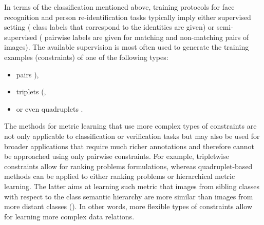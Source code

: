 In terms of the classification mentioned above, training protocols for face recognition and person re-identification tasks typically imply either supervised setting (\ie{} class labels that correspond to the identities are given) or semi-supervised (\ie{} pairwise labels are given for matching and non-matching pairs of images). The available supervision is most often used to generate the training examples (constraints) of one of the following types: 
\begin{itemize}
    \item pairs \citep{davis2007information,mignon2012pcca,hirzer2012person,koestinger2012large,liao2015person}), \item triplets (\citep{Zheng13}, 
    \item or even quadruplets \citep{law2013quadruplet}. 
\end{itemize}
The methods for metric learning that use more complex types of constraints are not only applicable to classification or verification tasks but may also be used for broader applications that require much richer annotations and therefore cannot be approached using only pairwise constraints. For example, tripletwise constraints allow for ranking problems formulations, whereas quadruplet-based methods can be applied to either ranking problems or hierarchical metric learning. The latter aims at learning  such metric that images from 
sibling classes with respect to the class semantic hierarchy
are more similar than images from more distant classes (\citep{law2013quadruplet}). 
In other words, more flexible types of constraints allow for learning more complex data relations.








